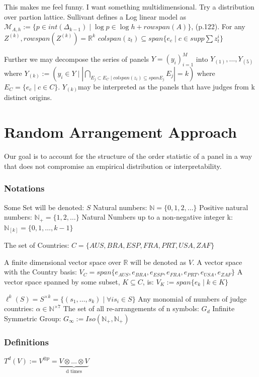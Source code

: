 \documentclass{article}
\begin{document}
This makes me feel funny. I want something multidimensional. Try a distribution over partion lattice.
Sullivant defines a Log linear model as $\mathcal{M}_{A,h} := \{p \in int(\Delta_{k-1}) \mid \log p \in \log h + rowspan(A) \}$, (p.122).
For any $Z^{(k)}, rowspan(Z^{(k)}) = \mathbb{R}^k$
$colspan(z_t) \subseteq span\{e_c \mid c \in supp \sum z_t^i\}$

Further we may decompose the series of panels $Y=(y_i)_{i=1}^M$ into $Y_{(1)}, \dots ,Y_{(5)}$where $Y_{(k)} := (y_i \in Y \mid |\bigcap_{E_j\subset E_C \mid colspan(z_i) \subseteq span E_j} E_j|=k)$ where $E_C = \{e_c \mid c \in C\}$. $Y_{(k)} $may be interpreted as the panels that have judges from k distinct origins. 

\section{Random Arrangement Approach}
Our goal is to account for the structure of the order statistic of a panel in a way that does not compromise an empirical distribution or interpretability.





\subsubsection{Notations}
Some Set will be denoted: $S$
Natural numbers: $\mathbb{N} = \{0,1,2,\dots\}$
Positive natural numbers: $\mathbb{N_+} = \{1,2,\dots\}$
Natural Numbers up to a non-negative integer k: $\mathbb{N}_{[k]} = \{0,1,\dots,k-1\} $

The set of Countries: $C = \{AUS,BRA,ESP,FRA,PRT,USA,ZAF\}$

A finite dimensional vector space over $\mathbb{R}$ will be denoted as $V$.
A vector space with the Country basis: $V_C = span\{e_{AUS},e_{BRA},e_{ESP},e_{FRA},e_{PRT},e_{USA},e_{ZAF} \}$
A vector space spanned by some subset, $K\subseteq C$, is: $V_K := span\{e_k \mid k \in K\}$

$\ell^k(S) = S^{\times k} = \{(s_1,\dots,s_k)\mid \forall is_i\in S\}$
Any monomial of numbers of judge countries: $\alpha \in \mathbb{N}^{\times 7}$
The set of all re-arrangements of n symbols: $G_d$
Infinite Symmetric Group: $G_\infty := Iso(\mathbb{N_+},\mathbb{N_+}) $
\subsubsection{Definitions}
$T^d(V) := V^{\otimes p} = \underbrace{V\otimes\dots\otimes V}_{\text{d times}} $
\end{document}

